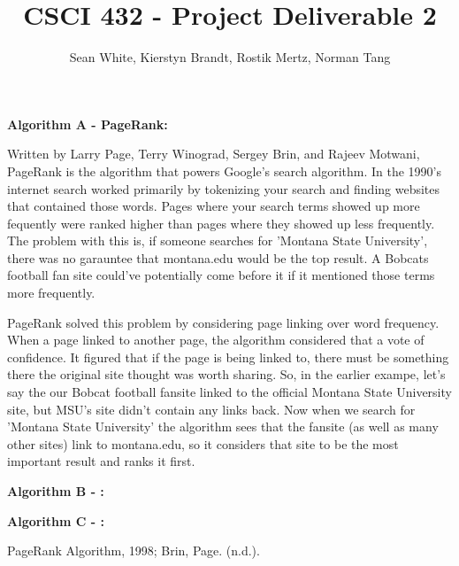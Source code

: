 \documentclass[12pt]{article}
\author{Sean White, Kierstyn Brandt, Rostik Mertz, Norman Tang}
\title{CSCI 432 - Project Deliverable 2}
\begin{document}
\maketitle

\noindent
\textbf{Algorithm A - PageRank:}\smallskip

Written by Larry Page, Terry Winograd, Sergey Brin, and Rajeev Motwani, PageRank is the algorithm that powers Google's search algorithm. In the 1990's internet search worked primarily by tokenizing your search and finding websites that contained those words. Pages where your search terms showed up more fequently were ranked higher than pages where they showed up less frequently. The problem with this is, if someone searches for 'Montana State University', there was no garauntee that montana.edu would be the top result. A Bobcats football fan site could've potentially come before it if it mentioned those terms more frequently.

PageRank solved this problem by considering page linking over word frequency. When a page linked to another page, the algorithm considered that a vote of confidence. It figured that if the page is being linked to, there must be something there the original site thought was worth sharing. So, in the earlier exampe, let's say the our Bobcat football fansite linked to the official Montana State University site, but MSU's site didn't contain any links back. Now when we search for 'Montana State University' the algorithm sees that the fansite (as well as many other sites) link to montana.edu, so it considers that site to be the most important result and ranks it first.
\bigskip

\noindent
\textbf{Algorithm B - :}\smallskip

\bigskip
\noindent
\textbf{Algorithm C - :}\smallskip

\bigskip

PageRank Algorithm, 1998; Brin, Page. (n.d.).
\end{document}
